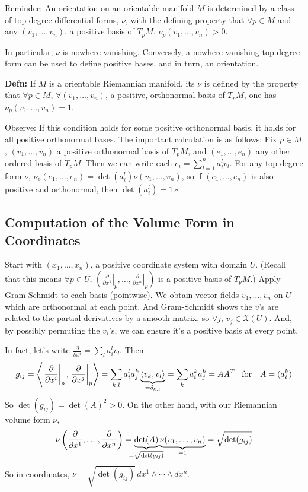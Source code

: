 \documentclass[10pt,letterpaper]{article}
\newcommand{\n}{\hfill\break}
\newcommand{\hangblock}[2]{\par\noindent\settowidth{\hangindent}{\textbf{#1: }}\textbf{#1: }\nolinebreak#2}
\newcommand{\defn}[1]{\hangblock{Defn}{#1}}
\newcommand{\proven}{\;$\square$\n}
\newcommand{\ptxt}[1]{\textrm{\textnormal{#1}}}
\newcommand{\pdat}[3]{\left.\pd{#1}{#2}\right|_{#3}}
\newcommand{\tpose}{^{T}\!}
\newcommand{\iprod}[1]{\left<#1\right>}
\newcommand{\pd}[2]{\frac{\partial{}#1}{\partial{}#2}}
\newcommand{\paren}[1]{\left(#1\right)}
\let\u\relax
\newcommand{\u}[1]{\underline{#1}}
\begin{document}
\par\noindent
Reminder: An orientation on an orientable manifold $M$ is determined by a class of top-degree differential forms, $\nu$, with the defining property that $\forall{}p\in{}M$ and any $(v_{1},\ldots,v_{n})$, a positive basis of $T_{p}M$, $\nu_{p}(v_{1},\ldots,v_{n})>0$.\n

\par\noindent
In particular, $\nu$ is nowhere-vanishing. Conversely, a nowhere-vanishing top-degree form can be used to define positive bases, and in turn, an orientation.\n

\defn{
	If $M$ is a orientable Riemannian manifold, its \u{volume form} $\nu$ is defined by the property that $\forall{}p\in{}M$, $\forall(v_{1},\ldots,v_{n})$, a positive, orthonormal basis of $T_{p}M$, one has $\nu_{p}(v_{1},\ldots,v_{n})=1$.\n
}

\par\noindent
Observe: If this condition holds for some positive orthonormal basis, it holds for all positive orthonormal bases. The important calculation is as follows: Fix $p\in{}M$, $(v_{1},\ldots,v_{n})$ a positive orthonormal basis of $T_{p}M$, and $(e_{1},\ldots,e_{n})$ any other ordered basis of $T_{p}M$. Then we can write each $e_{i}=\sum_{l=1}^{n}a_{i}^{l}v_{l}$. For any top-degree form $\nu$, $\nu_{p}(e_{1},\ldots,e_{n})=\det(a_{i}^{l})\nu(v_{1},\ldots,v_{n})$, so if $(e_{1},\ldots,e_{n})$ is also positive and orthonormal, then $\det(a_{i}^{l})=1$.\proven

\subsection*{Computation of the Volume Form in Coordinates}

\par\noindent
Start with $(x_{1},\ldots,x_{n})$, a positive coordinate system with domain $U$. (Recall that this means $\forall{}p\in{}U$, $(\pdat{}{x^{1}}{p},\ldots,\pdat{}{x^{n}}{p})$ is a positive basis of $T_{p}M$.) Apply Gram-Schmidt to each basis (pointwise). We obtain vector fields $v_{1},\ldots,v_{n}$ on $U$ which are orthonormal at each point. And Gram-Schmidt shows the $v$'s are related to the partial derivatives by a smooth matrix, so $\forall{}j$, $v_{j}\in\mathfrak{X}(U)$. And, by possibly permuting the $v_{i}$'s, we can ensure it's a positive basis at every point.\n

\par\noindent
In fact, let's write $\pd{}{x^{i}}=\sum_{l}a_{i}^{l}v_{l}$. Then
\[
	g_{ij}=\iprod{\pdat{}{x^{i}}{p},\pdat{}{x^{j}}{p}}=\sum_{k,l}a_{i}^{l}a_{j}^{k}\underbrace{\iprod{v_{k},v_{l}}}_{=\delta_{k,l}}=\sum_{k}a_{i}^{k}a_{j}^{k}=AA\tpose\quad\ptxt{for}\quad{}A=(a_{i}^{k})
\]
So $\det(g_{ij})=\det(A)^{2}>0$. On the other hand, with our Riemannian volume form $\nu$,
\[
	\nu\paren{\pd{}{x^{1}},\ldots,\pd{}{x^{n}}}=\underbrace{\det(A)}_{\mathclap{=\sqrt{\det(g_{ij})}}}\underbrace{\nu(v_{1},\ldots,v_{n})}_{=1}=\sqrt{\det(g_{ij})}
\]
So in coordinates, $\nu=\sqrt{\det(g_{ij})}\,dx^{1}\wedge\cdots\wedge{}dx^{n}$.\n
\end{document}
